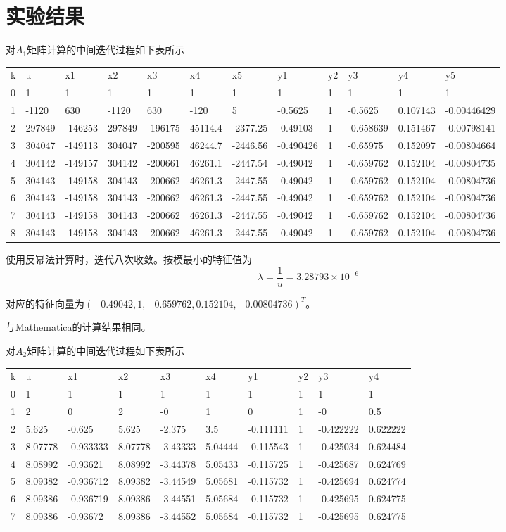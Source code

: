 \documentclass[english]{ctexart}
\providecommand{\tabularnewline}{\\}
\begin{document}
\section{实验结果}

对$A_{1}$矩阵计算的中间迭代过程如下表所示

\noindent %
\begin{tabular}{llllllllllll}
k & u & x1 & x2 & x3 & x4 & x5 & y1 & y2 & y3 & y4 & y5\tabularnewline
0 & 1 & 1 & 1 & 1 & 1 & 1 & 1 & 1 & 1 & 1 & 1\tabularnewline
1 & -1120 & 630 & -1120 & 630 & -120 & 5 & -0.5625 & 1 & -0.5625 & 0.107143 & -0.00446429\tabularnewline
2 & 297849 & -146253 & 297849 & -196175 & 45114.4 & -2377.25 & -0.49103 & 1 & -0.658639 & 0.151467 & -0.00798141\tabularnewline
3 & 304047 & -149113 & 304047 & -200595 & 46244.7 & -2446.56 & -0.490426 & 1 & -0.65975 & 0.152097 & -0.00804664\tabularnewline
4 & 304142 & -149157 & 304142 & -200661 & 46261.1 & -2447.54 & -0.49042 & 1 & -0.659762 & 0.152104 & -0.00804735\tabularnewline
5 & 304143 & -149158 & 304143 & -200662 & 46261.3 & -2447.55 & -0.49042 & 1 & -0.659762 & 0.152104 & -0.00804736\tabularnewline
6 & 304143 & -149158 & 304143 & -200662 & 46261.3 & -2447.55 & -0.49042 & 1 & -0.659762 & 0.152104 & -0.00804736\tabularnewline
7 & 304143 & -149158 & 304143 & -200662 & 46261.3 & -2447.55 & -0.49042 & 1 & -0.659762 & 0.152104 & -0.00804736\tabularnewline
8 & 304143 & -149158 & 304143 & -200662 & 46261.3 & -2447.55 & -0.49042 & 1 & -0.659762 & 0.152104 & -0.00804736\tabularnewline
\end{tabular}

使用反幂法计算时，迭代八次收敛。按模最小的特征值为
\begin{equation}
\lambda=\frac{1}{u}=3.28793\times10^{-6}
\end{equation}

对应的特征向量为$(-0.49042,1,-0.659762,0.152104,-0.00804736)^{T}$。

与Mathematica的计算结果相同。

对$A_{2}$矩阵计算的中间迭代过程如下表所示

\begin{tabular}{llllllllll}
k & u & x1 & x2 & x3 & x4 & y1 & y2 & y3 & y4\tabularnewline
0 & 1 & 1 & 1 & 1 & 1 & 1 & 1 & 1 & 1\tabularnewline
1 & 2 & 0 & 2 & -0 & 1 & 0 & 1 & -0 & 0.5\tabularnewline
2 & 5.625 & -0.625 & 5.625 & -2.375 & 3.5 & -0.111111 & 1 & -0.422222 & 0.622222\tabularnewline
3 & 8.07778 & -0.933333 & 8.07778 & -3.43333 & 5.04444 & -0.115543 & 1 & -0.425034 & 0.624484\tabularnewline
4 & 8.08992 & -0.93621 & 8.08992 & -3.44378 & 5.05433 & -0.115725 & 1 & -0.425687 & 0.624769\tabularnewline
5 & 8.09382 & -0.936712 & 8.09382 & -3.44549 & 5.05681 & -0.115732 & 1 & -0.425694 & 0.624774\tabularnewline
6 & 8.09386 & -0.936719 & 8.09386 & -3.44551 & 5.05684 & -0.115732 & 1 & -0.425695 & 0.624775\tabularnewline
7 & 8.09386 & -0.93672 & 8.09386 & -3.44552 & 5.05684 & -0.115732 & 1 & -0.425695 & 0.624775\tabularnewline
\end{tabular}
\end{document}

